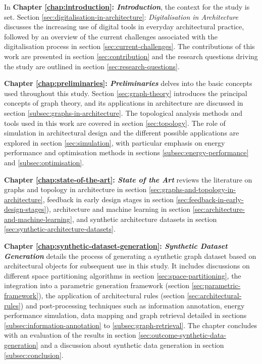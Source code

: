 \documentclass[a4paper, 12pt]{report}
\begin{document}
In \textbf{Chapter \ref{chap:introduction}: \emph{Introduction}}, the context for the study is set. Section \ref{sec:digitalisation-in-architecture}: \emph{Digitalisation in Architecture} discusses the increasing use of digital tools in everyday architectural practice, followed by an overview of the current challenges associated with the digitalisation process in section \ref{sec:current-challenges}. The contributions of this work are presented in section \ref{sec:contribution} and the research questions driving the study are outlined in section \ref{sec:research-questions}.

\textbf{Chapter \ref{chap:preliminaries}: \emph{Preliminaries}} delves into the basic concepts used throughout this study. Section \ref{sec:graph-theory} introduces the principal concepts of graph theory, and its applications in architecture are discussed in section \ref{subsec:graphs-in-architecture}. The topological analysis methods and tools used in this work are covered in section \ref{sec:topology}. The role of simulation in architectural design and the different possible applications are explored in section \ref{sec:simulation}, with particular emphasis on energy performance and optimisation methods in sections \ref{subsec:energy-performance} and \ref{subsec:optimisation}.

\textbf{Chapter \ref{chap:state-of-the-art}: \emph{State of the Art}} reviews the literature on graphs and topology in architecture in section \ref{sec:graphs-and-topology-in-architecture}, feedback in early design stages in section \ref{sec:feedback-in-early-design-stages}), architecture and machine learning in section \ref{sec:architecture-and-machine-learning}, and synthetic architecture datasets in section \ref{sec:synthetic-architecture-datasets}.

\textbf{Chapter \ref{chap:synthetic-dataset-generation}: \emph{Synthetic Dataset Generation}} details the process of generating a synthetic graph dataset based on architectural objects for subsequent use in this study. It includes discussions on different space partitioning algorithms in section \ref{sec:space-partitioning}, the integration into a parametric generation framework (section \ref{sec:parametric-framework}), the application of architectural rules (section \ref{sec:architectural-rules}) and post-processing techniques such as information annotation, energy performance simulation, data mapping and graph retrieval detailed in sections \ref{subsec:information-annotation} to \ref{subsec:graph-retrieval}. The chapter concludes with an evaluation of the results in section \ref{sec:outcome-synthetic-data-generation} and a discussion about synthetic data generation in section \ref{subsec:conclusion}.
\end{document}
